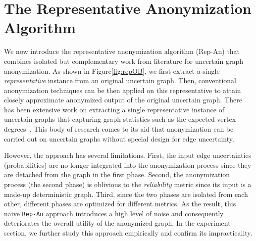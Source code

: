 \section{The Representative Anonymization Algorithm}
\label{sec:repOB}

We now introduce the representative anonymization algorithm (Rep-An) that combines isolated but complementary work from literature for uncertain graph anonymization. As shown in Figure\ref{fig:repOB}, we first extract a single \emph{representative} instance from an original uncertain graph. Then, conventional anonymization techniques can be then applied on this representative to attain closely approximate anonymized output of the original uncertain graph. There has been extensive work on extracting a single representative instance of uncertain graphs that capturing graph statistics such as the expected vertex degrees~\cite{Parchas_Gullo_Papadias_Bonchi_2014}. This body of research comes to its aid that anonymization can be carried out on uncertain graphs without special design for edge uncertainty.

However, the approach has several limitations. First, the input edge uncertainties (probabilities) are no longer integrated into the anonymization process since they are detached from the graph in the first phase. Second, the anonymization process (the second phase) is oblivious to the {\em reliability} metric since its input is a made-up deterministic graph. Third, since the two phases are isolated from each other, different phases are optimized for different metrics. As the result, this naive \texttt{Rep-An} approach introduces a high level of noise and consequently deteriorates the overall utility of the anonymized graph. 
In the experiment section, we further study this approach empirically and confirm its impracticality.



